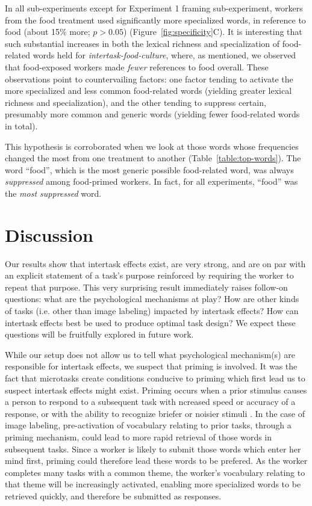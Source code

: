 \documentclass{sigchi}
\begin{document}
In all sub-experiments except for Experiment 1 framing sub-experiment, 
workers from the food treatment used significantly more specialized words, 
in reference to food 
(about 15\% more; $p > 0.05$) (Figure~\ref{fig:specificity}C).
It is interesting that such substantial increases in both the lexical 
richness and specialization of food-related words 
held for \textit{intertask-food-culture}, where, as mentioned, we observed 
that food-exposed workers made \textit{fewer} references to food overall. 
These observations point 
to countervailing factors: one factor tending to activate the more 
specialized and less common food-related words 
(yielding greater lexical richness and specialization), and the other tending 
to suppress certain, presumably more common and generic words 
(yielding fewer food-related words in total).

This hypothesis is corroborated when we look at those words whose 
frequencies changed the most from one treatment to another 
(Table~\ref{table:top-words}).  
The word ``food'', which is the most generic possible food-related word, was 
always \textit{suppressed} among food-primed workers.  In fact, 
for all experiments, ``food'' was the \textit{most suppressed} word.

\section{Discussion}
Our results show that intertask effects exist, are very strong, and are
on par with an explicit statement of a task's purpose reinforced by
requiring the worker to repeat that purpose.  This very surprising 
result immediately raises follow-on questions: what are the psychological
mechanisms at play? How are other kinds of tasks (i.e. other than image 
labeling) impacted by intertask effects?  How can intertask effects best 
be used to produce optimal task design?  We expect these questions will
be fruitfully explored in future work.

While our setup does not allow us to tell what psychological mechanism(s) 
are responsible for intertask effects, we suspect that priming is involved.
It was the fact that microtasks create conditions conducive to priming 
which first lead us to suspect intertask effects might exist.  
Priming occurs when a prior stimulus causes a person to respond to a 
subsequent task with ncreased speed or 
accuracy of a response, or with the ability to recognize briefer or 
noisier stimuli \cite{BJOP1796,BJOP1826,Huber2008324}.
In the case of image labeling, pre-activation of 
vocabulary relating to prior tasks, through a priming mechanism, 
could lead to more rapid retrieval of those words in subsequent tasks.  
Since a worker is likely to submit those words which enter her mind first, 
priming could therefore lead these words to be prefered.  As the worker
completes many tasks with a common theme, the worker's vocabulary relating
to that theme will be increasingly activated, enabling more specialized
words to be retrieved quickly, and therefore be submitted as responses.
\end{document}
